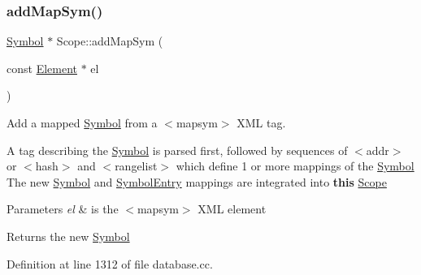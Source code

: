 \subsubsection{\texorpdfstring{addMapSym()}{addMapSym()}}
{\footnotesize\ttfamily \mbox{\hyperlink{class_symbol}{Symbol}} $\ast$ Scope\+::add\+Map\+Sym (\begin{DoxyParamCaption}\item[{const \mbox{\hyperlink{class_element}{Element}} $\ast$}]{el }\end{DoxyParamCaption})}



Add a mapped \mbox{\hyperlink{class_symbol}{Symbol}} from a $<$mapsym$>$ X\+ML tag. 

A tag describing the \mbox{\hyperlink{class_symbol}{Symbol}} is parsed first, followed by sequences of $<$addr$>$ or $<$hash$>$ and $<$rangelist$>$ which define 1 or more mappings of the \mbox{\hyperlink{class_symbol}{Symbol}} The new \mbox{\hyperlink{class_symbol}{Symbol}} and \mbox{\hyperlink{class_symbol_entry}{Symbol\+Entry}} mappings are integrated into {\bfseries{this}} \mbox{\hyperlink{class_scope}{Scope}} 
\begin{DoxyParams}{Parameters}
{\em el} & is the $<$mapsym$>$ X\+ML element \\
\hline
\end{DoxyParams}
\begin{DoxyReturn}{Returns}
the new \mbox{\hyperlink{class_symbol}{Symbol}} 
\end{DoxyReturn}


Definition at line 1312 of file database.\+cc.

